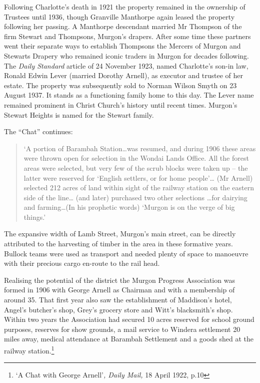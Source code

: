 Following Charlotte's death in 1921 the property remained in the
ownership of Trustees until 1936, though Granville Manthorpe again
leased the property following her passing. A Manthorpe descendant
married Mr Thompson of the firm Stewart and Thompsons, Murgon's drapers.
After some time these partners went their separate ways to establish
Thompsons the Mercers of Murgon and Stewarts Drapery who remained iconic
traders in Murgon for decades following. The \emph{Daily Standard}
article of 24 November 1923, named Charlotte's son-in law, Ronald Edwin
Lever (married Dorothy Arnell), as executor and trustee of her estate.
The property was subsequently sold to Norman Wilson Smyth on 23 August
1937. It stands as a functioning family home to this day. The Lever name
remained prominent in Christ Church's history until recent times.
Murgon's Stewart Heights is named for the Stewart family.

The ``Chat'' continues:

\begin{quote}
`A portion of Barambah Station\ldots was resumed, and during 1906 these
areas were thrown open for selection in the Wondai Lands Office. All the
forest areas were selected, but very few of the scrub blocks were taken
up -- the latter were reserved for `English settlers, or for home
people'\ldots{} (Mr Arnell) selected 212 acres of land within sight of
the railway station on the eastern side of the line\ldots{} (and later)
purchased two other selections \ldots for dairying and farming\ldots(In
his prophetic words) `Murgon is on the verge of big things.'
\end{quote}

The expansive width of Lamb Street, Murgon's main street, can be
directly attributed to the harvesting of timber in the area in these
formative years. Bullock teams were used as transport and needed plenty
of space to manoeuvre with their precious cargo en-route to the rail
head.

Realising the potential of the district the Murgon Progress Association
was formed in 1906 with George Arnell as Chairman and with a membership
of around 35. That first year also saw the establishment of Maddison's
hotel, Angel's butcher's shop, Grey's grocery store and Witt's
blacksmith's shop. Within two years the Association had secured 10 acres
reserved for school ground purposes, reserves for show grounds, a mail
service to Windera settlement 20 miles away, medical attendance at
Barambah Settlement and a goods shed at the railway station.\footnote{`A
  Chat with George Arnell'\emph{, Daily Mail,} 18 April 1922, p.10}

